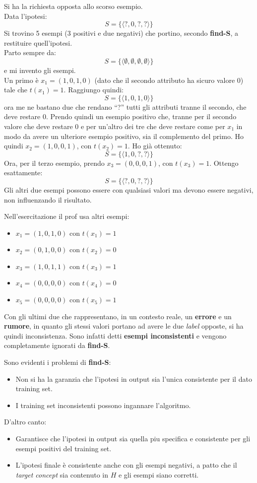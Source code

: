 \begin{esempio}
  Si ha la richiesta opposta allo scorso esempio. \\
  Data l'ipotesi:
  \[S=\{\langle ?, 0,?,?\rangle\}\]
  Si trovino 5 esempi (3 positivi e due negativi) che portino, secondo
  \textbf{find-S}, a restituire quell'ipotesi.\\
  Parto sempre da:
  \[S=\{\langle\emptyset,\emptyset,\emptyset,\emptyset\rangle\}\]
  e mi invento gli esempi.\\
  Un primo è $x_1=(1, 0, 1, 0)$ (dato che il secondo attributo ha sicuro valore 0)
  tale che $t(x_1)=1$. Raggiungo quindi: 
  \[S=\{\langle 1, 0, 1, 0\rangle\}\]
  ora me ne bastano due che rendano ``?'' tutti gli attributi tranne il secondo,
  che deve restare 0. Prendo quindi un esempio positivo che, tranne per il secondo
  valore che deve restare 0 e per un'altro dei tre che deve restare come per
  $x_1$ in modo da avere un ulteriore esempio positivo, sia il complemento del
  primo. Ho quindi $x_2=(1, 0, 0, 1)$, con 
  $t(x_2)=1$. Ho già ottenuto:
  \[S=\{\langle 1, 0,?,?\rangle\}\]
  Ora, per il terzo esempio, prendo $x_3=(0, 0, 0, 1)$, con $t(x_3)=1$. Ottengo
  esattamente:
  \[S=\{\langle ?, 0,?,?\rangle\}\]
  Gli altri due esempi possono essere con qualsiasi valori ma devono essere
  negativi, non influenzando il risultato.\\
  \begin{shaded}
    Nell'esercitazione il prof usa altri esempi:
    \begin{itemize}
      \item $x_1=(1, 0, 1, 0)$ con $t(x_1)=1$
      \item $x_2=(0, 1, 0, 0)$ con $t(x_2)=0$
      \item $x_3=(1, 0, 1, 1)$ con $t(x_3)=1$
      \item $x_4=(0, 0, 0, 0)$ con $t(x_4)=0$
      \item $x_5=(0, 0, 0, 0)$ con $t(x_5)=1$
    \end{itemize}
    Con gli ultimi due che rappresentano, in un contesto reale,
    un \textbf{errore} e un \textbf{rumore}, in quanto gli stessi valori portano
    ad avere le due \textit{label} opposte, si ha quindi inconsistenza. Sono
    infatti detti \textbf{esempi inconsistenti} e vengono completamente ignorati
    da \textbf{find-S}.
  \end{shaded}
\end{esempio}
Sono evidenti i problemi di \textbf{find-S}:
\begin{itemize}
  \item Non si ha la garanzia che l'ipotesi in output sia l'unica consistente per il dato training set.
  \item I training set inconsistenti possono ingannare l'algoritmo.
\end{itemize}
D'altro canto:
\begin{itemize}
  \item Garantisce che l'ipotesi in output sia quella piu specifica
  e consistente per gli esempi positivi del training set.
  \item L'ipotesi finale è consistente anche con gli esempi negativi, a patto
  che il \textit{target concept} sia contenuto in $H$ e gli esempi siano
  corretti.
\end{itemize}
